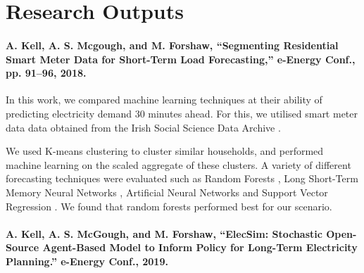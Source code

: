 \documentclass[12pt]{article}
\begin{document}
%





\clearpage

\clearpage

\section{Research Outputs}

\paragraph{ A. Kell, A. S. Mcgough, and M. Forshaw, “Segmenting Residential Smart Meter Data for Short-Term Load Forecasting,” e-Energy Conf., pp. 91--96, 2018. \cite{Kell2018}
}


In this work, we compared machine learning techniques at their ability of predicting electricity demand 30 minutes ahead. For this, we utilised smart meter data data obtained from the Irish Social Science Data Archive \cite{cer_2012}.

We used K-means clustering \cite{Forgy65} to cluster similar households, and performed machine learning on the scaled aggregate of these clusters. A variety of different forecasting techniques were evaluated such as Random Forests \cite{TinKamHo}, Long Short-Term Memory Neural Networks \cite{lstm}, Artificial Neural Networks \cite{book:984557} and Support Vector Regression \cite{Drucker1997}. We found that random forests performed best for our scenario.


\paragraph{A. Kell, A. S. McGough, and M. Forshaw, “ElecSim: Stochastic Open-Source Agent-Based Model to Inform Policy for Long-Term Electricity Planning.” e-Energy Conf., 2019.
}
\end{document}
